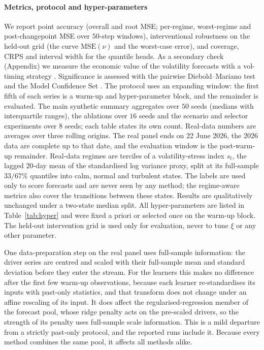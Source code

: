 \documentclass[authoryear,preprint,12pt]{elsarticle}
\theoremstyle{plain}
\theoremstyle{remark}
\begin{document}
\paragraph{Metrics, protocol and hyper-parameters}
We report point accuracy (overall and root MSE; per-regime, worst-regime and
post-changepoint MSE over $50$-step windows), interventional robustness on the
held-out grid (the curve $\mathrm{MSE}(\nu)$ and the worst-case error), and coverage,
CRPS and interval width for the quantile heads. As a secondary check (Appendix) we
measure the economic value of the volatility forecasts with a vol-timing strategy
\citep{fleming2001voltiming}. Significance is assessed with the pairwise
Diebold--Mariano test \citep{diebold1995dm} and the Model Confidence Set
\citep{hansen2011mcs}. The protocol uses an expanding window: the first fifth of each
series is a warm-up and hyper-parameter block, and the remainder is evaluated. The
main synthetic summary aggregates over $50$ seeds (medians with interquartile ranges),
the ablations over $16$ seeds and the scenario and selector experiments over $8$
seeds; each table states its own count. Real-data numbers are averages over three
rolling origins. The real panel ends on 22 June 2026, the 2026 data are complete up to
that date, and the evaluation window is the post-warm-up remainder. Real-data regimes
are terciles of a volatility-stress index $s_t$, the lagged $20$-day mean of the standardised log variance proxy, split at its full-sample $33/67\%$ quantiles into calm, normal and turbulent states. The labels are used only to score forecasts and are never seen by any method; the
regime-aware metrics also cover the transitions between these states. Results are
qualitatively unchanged under a two-state median split. All hyper-parameters are
listed in Table~\ref{tab:hyper} and were fixed a priori or selected once on the
warm-up block. The held-out intervention grid is used only for evaluation, never to tune $\xi$ or any other parameter.

One data-preparation step on the real panel uses full-sample information: the driver series are centred and scaled with their full-sample mean and standard deviation before they enter the stream. For the learners this makes no difference after the first few warm-up observations, because each learner re-standardises its inputs with past-only statistics, and that transform does not change under an affine rescaling of its input. It does affect the regularised-regression member of the forecast pool, whose ridge penalty acts on the pre-scaled drivers, so the strength of its penalty uses full-sample scale information. This is a mild departure from a strictly past-only protocol, and the reported runs include it. Because every method combines the same pool, it affects all methods alike.
\end{document}
